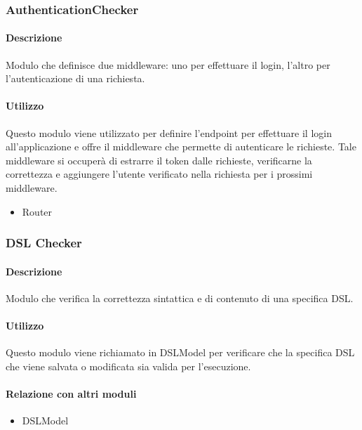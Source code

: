 \subsubsection{AuthenticationChecker}
\paragraph*{Descrizione}
Modulo che definisce due middleware: uno per effettuare il login, l'altro per l'autenticazione di una richiesta.

\paragraph*{Utilizzo}
Questo modulo viene utilizzato per definire l'endpoint per effettuare il login all'applicazione e offre il middleware che permette di autenticare le richieste. Tale middleware si occuperà di estrarre il token dalle richieste, verificarne la correttezza e aggiungere l'utente verificato nella richiesta per i prossimi middleware.


\begin{itemize}
\item Router
\end{itemize}

\subsubsection{DSL Checker}
\paragraph*{Descrizione}
Modulo che verifica la correttezza sintattica e di contenuto di una specifica DSL.

\paragraph*{Utilizzo}
Questo modulo viene richiamato in DSLModel per verificare che la specifica DSL che viene salvata o modificata sia valida per l'esecuzione.

\paragraph*{Relazione con altri moduli}
\begin{itemize}
\item DSLModel
\end{itemize}


